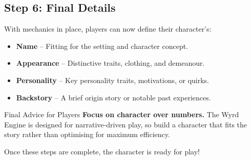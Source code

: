 \subsection{Step 6: Final Details}

With mechanics in place, players can now define their character’s:
\begin{itemize}
    \item \textbf{Name} – Fitting for the setting and character concept.
    \item \textbf{Appearance} – Distinctive traits, clothing, and demeanour.
    \item \textbf{Personality} – Key personality traits, motivations, or quirks.
    \item \textbf{Backstory} – A brief origin story or notable past experiences.
\end{itemize}

\begin{DndComment}{Final Advice for Players}
\textbf{Focus on character over numbers.} The Wyrd Engine is designed for narrative-driven play, so build a character that fits the story rather than optimising for maximum efficiency.
\end{DndComment}

Once these steps are complete, the character is ready for play!

